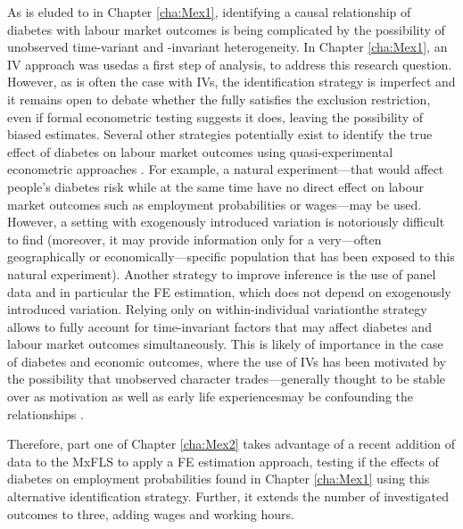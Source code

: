 As is eluded to in Chapter \ref{cha:Mex1}, identifying a causal relationship of diabetes with labour market outcomes is being complicated by the possibility of unobserved time-variant and -invariant heterogeneity. In Chapter \ref{cha:Mex1}, an \ac{IV} approach was used\DIFaddbegin \DIFadd{, }\DIFaddend as a first step of analysis, to address this research question. However, as is often the case with \acp{IV}, the identification strategy is imperfect and it remains open to debate whether the \DIFdelbegin {}\DIFdelend \DIFaddbegin {}\DIFaddend fully satisfies the exclusion restriction, even if formal econometric testing suggests it does, leaving the possibility of biased estimates. Several other strategies potentially exist to identify the true effect of diabetes on labour market outcomes using quasi-experimental econometric approaches \parencite{Antonakis2012}. For example, a natural experiment---that would affect people's diabetes risk while at the same time have no direct effect on labour market outcomes such as employment probabilities or wages---may be used. However, a setting with exogenously introduced variation is notoriously difficult to find (moreover, it  may provide information only for a very---often geographically or economically---specific population that has been exposed to this natural experiment). Another strategy to improve inference is the use of panel data and in particular the \ac{FE} estimation, which does not depend on exogenously introduced variation. Relying only on within-individual variation\DIFaddbegin \DIFadd{, }\DIFaddend the strategy allows to fully account for time-invariant factors that may affect diabetes and labour market outcomes simultaneously. This is likely of importance in the case of diabetes and economic outcomes, where the use of \ac{IV}s has been motivated by the possibility that unobserved character trades---generally thought to be stable over \DIFdelbegin {}\DIFdelend \DIFaddbegin {}\DIFaddend as motivation as well as early life experiences\DIFaddbegin \DIFadd{, }\DIFaddend may be confounding the relationships \parencite{Seuring2015}.

Therefore, part one of Chapter \ref{cha:Mex2} \DIFdelbegin \DIFdel{, }\DIFdelend takes advantage of a recent addition of data to the \ac{MxFLS} to apply a \ac{FE} estimation approach, testing if the effects of diabetes on employment probabilities found in Chapter \ref{cha:Mex1} \DIFaddbegin {}\DIFaddend using this alternative identification strategy. Further, it extends the number of investigated outcomes to three, adding wages and working hours.


